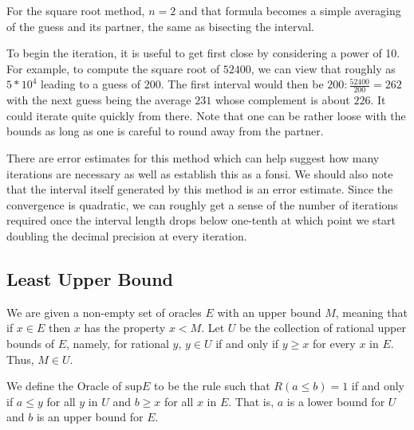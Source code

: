 \documentclass[12pt]{article}
\theoremstyle{remark}
\begin{document}
For the square root method, $n=2$ and that formula becomes a simple averaging of the guess and its partner, the same as bisecting the interval.  

To begin the iteration, it is useful to get first close by considering a power of 10. For example, to compute the square root of $52400$, we can view that roughly as $5*10^4$ leading to a guess of $200$. The first interval would then be $200: \frac{52400}{200} = 262$ with the next guess being the average $231$ whose complement is about $226$. It could iterate quite quickly from there. Note that one can be rather loose with the bounds as long as one is careful to round away from the partner.  

There are error estimates for this method which can help suggest how many iterations are necessary as well as establish this as a fonsi. We should also note that the interval itself generated by this method is an error estimate. Since the convergence is quadratic, we can roughly get a sense of the number of iterations required once the interval length drops below one-tenth at which point we start doubling the decimal precision at every iteration.  


\subsection{Least Upper Bound}

We are given a non-empty set of oracles $E$ with an upper bound $M$, meaning that if $x \in E$ then $x$ has the property $x < M$. Let $U$ be the collection of rational upper bounds of $E$, namely, for rational $y$, $y \in U$ if and only if $y \geq x$ for every $x$ in $E$.  Thus, $M \in U$.

We define the Oracle of $\mathrm{sup} E$ to be the rule such that $R(a\leq b) = 1$ if and only if $a \leq y$ for all $y$ in $U$ and $b \geq x$ for all $x$ in $E$. That is, $a$ is a lower bound for $U$ and $b$ is an upper bound for $E$.
\end{document}
